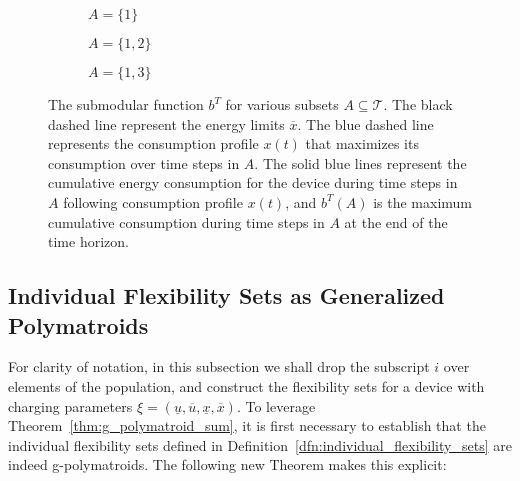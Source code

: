 \begin{figure*}[t]
    \centering
    \begin{subfigure}[b]{0.3\textwidth}
        \centering
        
        \label{fig:sub1}
        \caption*{$A=\{1\}$}
    \end{subfigure}
    \hfill
    \begin{subfigure}[b]{0.3\textwidth}
        \centering
        
        \label{fig:sub2}
        \caption*{$A=\{1,2\}$}

    \end{subfigure}
    \hfill
    \begin{subfigure}[b]{0.3\textwidth}
        \centering
        
        \label{fig:sub3}
        \caption*{$A=\{1,3\}$}
    \end{subfigure}

\caption{The submodular function $b^T$ for various subsets $A \subseteq \mathcal{T}$. The black dashed line represent the energy limits $\overline{x}$. The blue dashed line represents the consumption profile $x(t)$ that maximizes its consumption over time steps in $A$.
    The solid blue lines represent the cumulative energy consumption for the device during time steps in $A$ following consumption profile $x(t)$, and $b^T(A)$ is the maximum cumulative consumption during time steps in $A$ at the end of the time horizon.}
    \label{fig:paramodular}
\end{figure*}
\subsection{Individual Flexibility Sets as Generalized Polymatroids}
For clarity of notation, in this subsection we shall drop the subscript $i$ over elements of the population, and construct the flexibility sets for a device with charging parameters $\xi = (\underline{u}, \overline{u}, \underline{x}, \overline{x})$.
To leverage Theorem~\ref{thm:g_polymatroid_sum}, it is first necessary to establish that the individual flexibility sets defined in Definition~\ref{dfn:individual_flexibility_sets} are indeed g-polymatroids. 
The following new Theorem makes this explicit:


